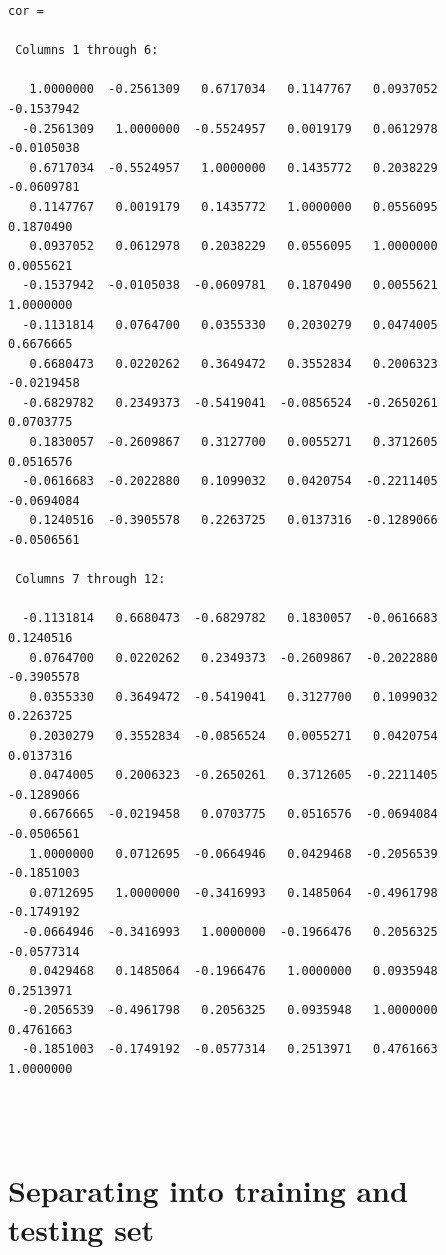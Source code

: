 \documentclass[11pt]{article}
\begin{document}
    \begin{Verbatim}[commandchars=\\\{\}]
cor =

 Columns 1 through 6:

   1.0000000  -0.2561309   0.6717034   0.1147767   0.0937052  -0.1537942
  -0.2561309   1.0000000  -0.5524957   0.0019179   0.0612978  -0.0105038
   0.6717034  -0.5524957   1.0000000   0.1435772   0.2038229  -0.0609781
   0.1147767   0.0019179   0.1435772   1.0000000   0.0556095   0.1870490
   0.0937052   0.0612978   0.2038229   0.0556095   1.0000000   0.0055621
  -0.1537942  -0.0105038  -0.0609781   0.1870490   0.0055621   1.0000000
  -0.1131814   0.0764700   0.0355330   0.2030279   0.0474005   0.6676665
   0.6680473   0.0220262   0.3649472   0.3552834   0.2006323  -0.0219458
  -0.6829782   0.2349373  -0.5419041  -0.0856524  -0.2650261   0.0703775
   0.1830057  -0.2609867   0.3127700   0.0055271   0.3712605   0.0516576
  -0.0616683  -0.2022880   0.1099032   0.0420754  -0.2211405  -0.0694084
   0.1240516  -0.3905578   0.2263725   0.0137316  -0.1289066  -0.0506561

 Columns 7 through 12:

  -0.1131814   0.6680473  -0.6829782   0.1830057  -0.0616683   0.1240516
   0.0764700   0.0220262   0.2349373  -0.2609867  -0.2022880  -0.3905578
   0.0355330   0.3649472  -0.5419041   0.3127700   0.1099032   0.2263725
   0.2030279   0.3552834  -0.0856524   0.0055271   0.0420754   0.0137316
   0.0474005   0.2006323  -0.2650261   0.3712605  -0.2211405  -0.1289066
   0.6676665  -0.0219458   0.0703775   0.0516576  -0.0694084  -0.0506561
   1.0000000   0.0712695  -0.0664946   0.0429468  -0.2056539  -0.1851003
   0.0712695   1.0000000  -0.3416993   0.1485064  -0.4961798  -0.1749192
  -0.0664946  -0.3416993   1.0000000  -0.1966476   0.2056325  -0.0577314
   0.0429468   0.1485064  -0.1966476   1.0000000   0.0935948   0.2513971
  -0.2056539  -0.4961798   0.2056325   0.0935948   1.0000000   0.4761663
  -0.1851003  -0.1749192  -0.0577314   0.2513971   0.4761663   1.0000000


    \end{Verbatim}

    \begin{center}
    \end{center}
    { \hspace*{\fill} \\}
    
    \hypertarget{separating-into-training-and-testing-set}{%
\section{Separating into training and testing
set}\label{separating-into-training-and-testing-set}}
\end{document}
